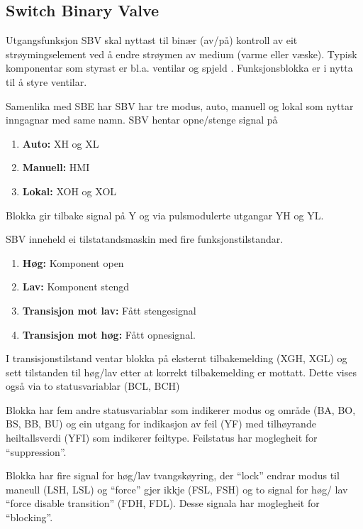 \subsection{Switch Binary Valve}

Utgangsfunksjon \gls{SBV} skal nyttast til binær (av/på) kontroll av eit strøymingselement ved å endre strøymen av medium (varme eller væske). 
Typisk komponentar som styrast er bl.a. ventilar og spjeld \citep{IEC-63131}.
Funksjonsblokka er i nytta til å styre ventilar.

Samenlika med \gls{SBE} har \gls{SBV} har tre modus, auto, manuell og lokal som nyttar inngagnar med same namn.
\gls{SBV} hentar opne/stenge signal på
\begin{enumerate}
    \item \textbf{Auto:}        XH og XL  
    \item \textbf{Manuell:}     HMI
    \item \textbf{Lokal:}       XOH og XOL
\end{enumerate}
Blokka gir tilbake signal på Y og via pulsmodulerte utgangar YH og YL.

\gls{SBV} inneheld ei tilstatandsmaskin med fire funksjonstilstandar. 
\begin{enumerate}
    \item \textbf{Høg:}                 Komponent open
    \item \textbf{Lav:}                 Komponent stengd
    \item \textbf{Transisjon mot lav:}  Fått stengesignal
    \item \textbf{Transisjon mot høg:}  Fått opnesignal.
\end{enumerate}

I transisjonstilstand ventar blokka på eksternt tilbakemelding (XGH, XGL) 
og sett tilstanden til høg/lav etter at korrekt tilbakemelding er mottatt.
Dette vises også via to statusvariablar (BCL, BCH)

Blokka har fem andre statusvariablar som indikerer modus og område (BA, BO, BS, BB, BU) og
ein utgang for indikasjon av feil (YF) med tilhøyrande heiltallsverdi (YFI) som indikerer feiltype. \newline
Feilstatus har moglegheit for ``suppression''.

Blokka har fire signal for høg/lav tvangskøyring, der ``lock'' endrar modus til maneull (LSH, LSL) og ``force'' gjer ikkje (FSL, FSH)
og to signal for høg/ lav ``force disable transition'' (FDH, FDL).
Desse signala har moglegheit for ``blocking''.

